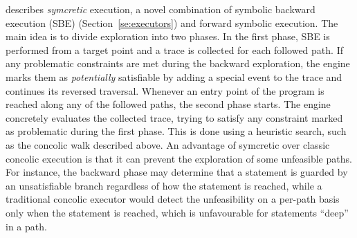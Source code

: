 {\cite{DA-ASE14} describes {\em symcretic} execution, a novel combination of symbolic backward execution (SBE) (Section~\ref{se:executors}) and forward symbolic execution. The main idea is to divide exploration into two phases. In the first phase, SBE is performed from a target point and a trace is collected for each followed path. If any problematic constraints are met during the backward exploration, the engine marks them as {\em potentially} satisfiable by adding a special event to the trace and continues its reversed traversal. Whenever an entry point of the program is reached along any of the followed paths, the second phase starts. The engine concretely evaluates the collected trace, trying to satisfy any constraint marked as problematic during the first phase. This is done using a heuristic search, such as the concolic walk described above. An advantage of symcretic over classic concolic execution is that it can prevent the exploration of some unfeasible paths. For instance, the backward phase may determine that a statement is guarded by an unsatisfiable branch regardless of how the statement is reached, while a traditional concolic executor would detect the unfeasibility on a per-path basis only when the statement is reached, which is unfavourable for statements ``deep'' in a path.
}
